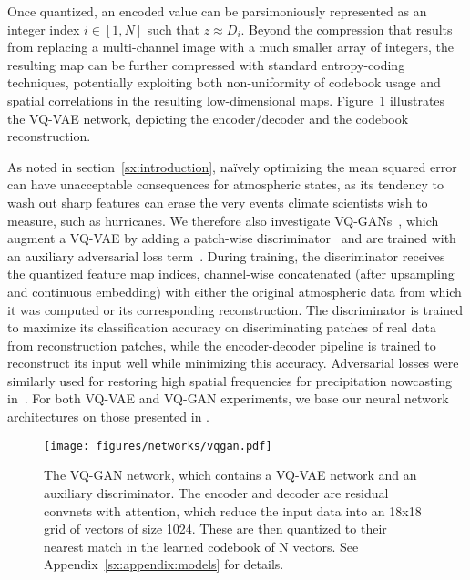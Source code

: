 Once quantized, an encoded value can be parsimoniously represented as an integer index $i \in [1, N]$ such that $z \approx D_i$.
Beyond the compression that results from replacing a multi-channel image with a much smaller array of integers, the resulting map can be further compressed with standard entropy-coding techniques, potentially exploiting both non-uniformity of codebook usage and spatial correlations in the resulting low-dimensional maps. Figure~\ref{fig:vqvae} illustrates the VQ-VAE network, depicting the encoder/decoder and the codebook reconstruction.

As noted in section~\ref{sx:introduction}, na\"ively optimizing the mean squared error can have unacceptable consequences for atmospheric states, as its tendency to wash out sharp features can erase the very events climate scientists wish to measure, such as hurricanes.
We therefore also investigate VQ-GANs~\citep{esser2021taming}, which augment a VQ-VAE by adding a patch-wise discriminator~\citep{isola2017image} and are trained with an auxiliary adversarial loss term~\citep{goodfellow2014gan}. During training, the discriminator receives the quantized feature map indices, channel-wise concatenated (after upsampling and continuous embedding) with either the original atmospheric data from which it was computed or its corresponding reconstruction. The discriminator is trained to maximize its classification accuracy on discriminating patches of real data from reconstruction patches, while the encoder-decoder pipeline is trained to reconstruct its input well while minimizing this accuracy.
Adversarial losses were similarly used for restoring high spatial frequencies for precipitation nowcasting in~\cite{ravuri2021nowcasting}.
For both VQ-VAE and VQ-GAN experiments, we base our neural network architectures on those presented in \cite{esser2021taming}.

\begin{figure}
    \centering
    \texttt{[image: figures/networks/vqgan.pdf]}
    \caption{The VQ-GAN network, which contains a VQ-VAE network and an auxiliary discriminator. The encoder and decoder are residual convnets with attention, which reduce the input data into an 18x18 grid of vectors of size 1024. These are then quantized to their nearest match in the learned codebook of N vectors. See Appendix~\ref{sx:appendix:models} for details.}
    \label{fig:vqvae}
\end{figure}

